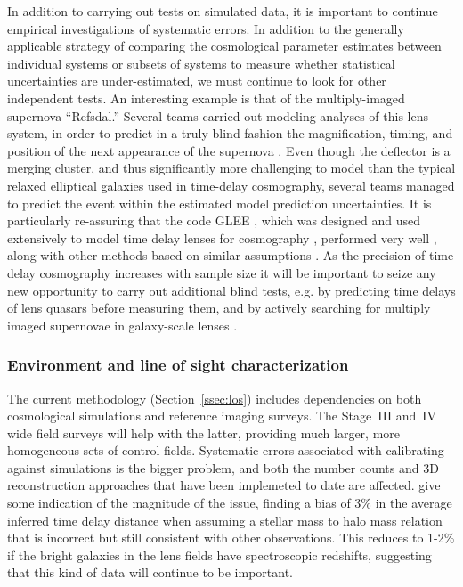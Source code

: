 In addition to carrying out tests on simulated data, it is important
to continue empirical investigations of systematic errors. In addition
to the generally applicable strategy of comparing the cosmological
parameter estimates between individual systems or subsets of systems
to measure whether statistical uncertainties are under-estimated, we
must continue to look for other independent tests. An interesting
example is that of the multiply-imaged supernova ``Refsdal.'' Several teams
carried out modeling analyses of this lens system, in order
to predict in a truly blind fashion the
magnification, timing, and position of the next appearance of the
supernova \citep{Kel++15,Ogu15,S+J15,Jau++16,Tre++16,Kaw++16,Gri++16}. Even
though the deflector is a merging cluster, and thus significantly more
challenging to model than the typical relaxed elliptical galaxies used
in time-delay cosmography, several teams managed to predict the event
\citep{Tre++16,Kel++16} within the estimated model prediction uncertainties.
It is particularly re-assuring that the code {\sc GLEE} \citep{S+H10},
which was designed and used extensively to model time delay lenses for
cosmography \citep{Suy++10,Suy++13,Suy++14}, performed very well
\citep{Gri++16,Kel++16}, along with other methods based on similar assumptions \citep{Kaw++16}. As the precision of time delay cosmography increases
with sample size it will be important to seize any new opportunity to
carry out additional blind tests, e.g. by predicting time delays of
lens quasars before measuring them, and by actively searching for
multiply imaged supernovae in galaxy-scale lenses \citep{O+M10}.



\subsubsection{Environment and line of sight characterization}

The current methodology (Section~\ref{ssec:los}) includes dependencies
on both cosmological simulations and reference imaging surveys. The
Stage~III and~IV wide field surveys will help with the latter,
providing much larger, more homogeneous sets of control fields.
Systematic errors associated with calibrating against simulations is
the bigger problem, and both the number counts and 3D reconstruction
approaches that have been implemeted to date are affected.
\citet{CollettEtal2013} give some indication of the magnitude of the
issue, finding a bias of 3\% in the average inferred time delay distance
when assuming a stellar mass to halo mass relation that is incorrect
but still consistent with other observations. This reduces to 1-2\%
if the bright galaxies in the lens fields have spectroscopic redshifts,
suggesting that this kind of data will continue to be important.

